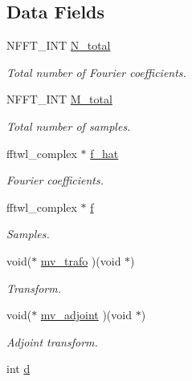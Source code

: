 \subsection*{Data Fields}
\begin{DoxyCompactItemize}
\item 
N\-F\-F\-T\-\_\-\-I\-N\-T \hyperlink{structnsfftl__plan_ab66e293cd22d1112f71762d7656692ff}{N\-\_\-total}
\begin{DoxyCompactList}\small\item\em Total number of Fourier coefficients. \end{DoxyCompactList}\item 
N\-F\-F\-T\-\_\-\-I\-N\-T \hyperlink{structnsfftl__plan_a60e803e00ea49d6edecfc8631afcbd4c}{M\-\_\-total}
\begin{DoxyCompactList}\small\item\em Total number of samples. \end{DoxyCompactList}\item 
fftwl\-\_\-complex $\ast$ \hyperlink{structnsfftl__plan_a93d9d361d56e03f44bc6a9d4265b9f43}{f\-\_\-hat}
\begin{DoxyCompactList}\small\item\em Fourier coefficients. \end{DoxyCompactList}\item 
fftwl\-\_\-complex $\ast$ \hyperlink{structnsfftl__plan_ada472d5a0fb2afc32b4d1683c98185f6}{f}
\begin{DoxyCompactList}\small\item\em Samples. \end{DoxyCompactList}\item 
void($\ast$ \hyperlink{structnsfftl__plan_aad46757ac44a32dbb04d0e453454acac}{mv\-\_\-trafo} )(void $\ast$)
\begin{DoxyCompactList}\small\item\em Transform. \end{DoxyCompactList}\item 
void($\ast$ \hyperlink{structnsfftl__plan_a658b4a71ff29aa1cc2febc66d6c175bd}{mv\-\_\-adjoint} )(void $\ast$)
\begin{DoxyCompactList}\small\item\em Adjoint transform. \end{DoxyCompactList}\item 
\hypertarget{structnsfftl__plan_aca82cd28238f0c1a5171eabd1d301f90}{int \hyperlink{structnsfftl__plan_aca82cd28238f0c1a5171eabd1d301f90}{d}}\label{structnsfftl__plan_aca82cd28238f0c1a5171eabd1d301f90}


\end{DoxyCompactItemize}
